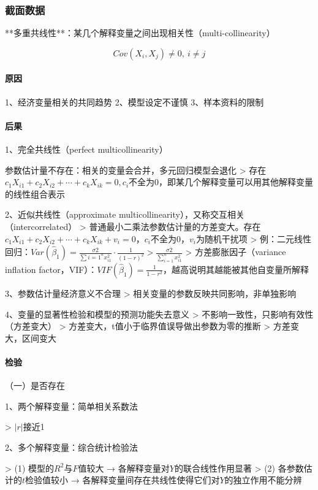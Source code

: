 \documentclass[12pt]{book}
\begin{document}
\subsubsection{截面数据}




**多重共线性**：某几个解释变量之间出现相关性（multi-collinearity）

$$
Cov\left(X_i,X_j\right)\neq0,\ i\neq j 
$$

\paragraph{原因}
1、经济变量相关的共同趋势  
2、模型设定不谨慎  
3、样本资料的限制

\paragraph{后果}
1、完全共线性（perfect multicollinearity）

参数估计量不存在：相关的变量会合并，多元回归模型会退化
> 存在$c_1X_{i1}+c_2X_{i2}+\cdots+c_kX_{ik}=0,c_i$不全为0，即某几个解释变量可以用其他解释变量的线性组合表示

2、近似共线性（approximate multicollinearity），又称交互相关（intercorrelated）
> 普通最小二乘法参数估计量的方差变大。存在$c_1X_{i1}+c_2X_{i2}+\cdots+c_kX_{ik}+v_i=0$，$c_i$不全为0，$v_i$为随机干扰项  
> 例：二元线性回归：$Var(\hat{\beta}_{1})=\frac{σ2}{\sum{i=1}^{n}{x_{i1}^{2}}}⋅\frac{1}{(1-r)^2}>\frac{σ2}{\sum_{i=1}^{n}{x_{i1}^{2}}}$  
> 方差膨胀因子（variance inflation factor，VIF）：$VIF\left({\hat{\beta}}_1\right)=\frac{1}{1-r^2}$，越高说明其越能被其他自变量所解释

3、参数估计量经济意义不合理
> 相关变量的参数反映共同影响，非单独影响

4、变量的显著性检验和模型的预测功能失去意义
> 不影响一致性，只影响有效性（方差变大）   
> 方差变大，t值小于临界值误导做出参数为零的推断  
> 方差变大，区间变大

\paragraph{检验}
（一）是否存在

1、两个解释变量：简单相关系数法

> $|r|$接近1

2、多个解释变量：综合统计检验法

> (1) 模型的$R^2$与$F$值较大 → 各解释变量对$Y$的联合线性作用显著  
> (2) 各参数估计的$t$检验值较小 → 各解释变量间存在共线性使得它们对$Y$的独立作用不能分辨
\end{document}
